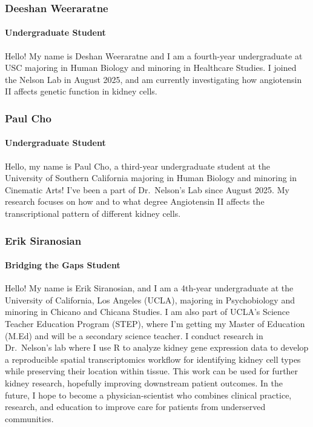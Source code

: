 \documentclass[
]{article}
\begin{document}
\subsubsection{Deeshan Weeraratne}\label{deeshan-weeraratne}

\paragraph{Undergraduate Student}\label{undergraduate-student-2}

Hello! My name is Deshan Weeraratne and I am a fourth-year undergraduate
at USC majoring in Human Biology and minoring in Healthcare Studies. I
joined the Nelson Lab in August 2025, and am currently investigating how
angiotensin II affects genetic function in kidney cells.

\subsubsection{Paul Cho}\label{paul-cho}

\paragraph{Undergraduate Student}\label{undergraduate-student-3}

Hello, my name is Paul Cho, a third-year undergraduate student at the
University of Southern California majoring in Human Biology and minoring
in Cinematic Arts! I've been a part of Dr.~Nelson's Lab since August
2025. My research focuses on how and to what degree Angiotensin II
affects the transcriptional pattern of different kidney cells.

\subsubsection{Erik Siranosian}\label{erik-siranosian}

\paragraph{Bridging the Gaps Student}\label{bridging-the-gaps-student}

Hello! My name is Erik Siranosian, and I am a 4th-year undergraduate at
the University of California, Los Angeles (UCLA), majoring in
Psychobiology and minoring in Chicano and Chicana Studies. I am also
part of UCLA's Science Teacher Education Program (STEP), where I'm
getting my Master of Education (M.Ed) and will be a secondary science
teacher. I conduct research in Dr.~Nelson's lab where I use R to analyze
kidney gene expression data to develop a reproducible spatial
transcriptomics workflow for identifying kidney cell types while
preserving their location within tissue. This work can be used for
further kidney research, hopefully improving downstream patient
outcomes. In the future, I hope to become a physician-scientist who
combines clinical practice, research, and education to improve care for
patients from underserved communities.
\end{document}
